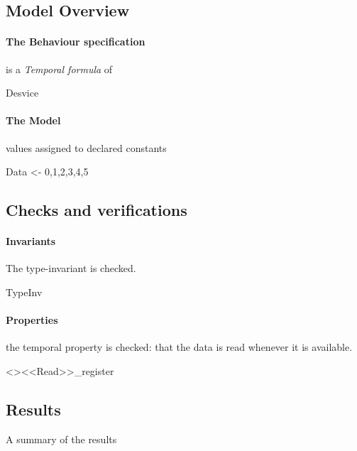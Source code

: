 \documentclass[12pt]{article}
\begin{document}
\subsection{Model Overview}
\paragraph{The Behaviour specification} is a \emph{Temporal formula} of
\begin{tla}
	Desvice
\end{tla}
\begin{tlatex}
%
\end{tlatex}

\paragraph{The Model} values assigned to declared constants
\begin{tla}
	Data <- {0,1,2,3,4,5}
\end{tla}
\begin{tlatex}
%
\end{tlatex}

\subsection{Checks and verifications}
\paragraph{Invariants} The type-invariant is checked.
\begin{tla}
	TypeInv
\end{tla}
\begin{tlatex}
%
\end{tlatex}

\paragraph{Properties} the temporal property is checked: that the data is read
whenever it is available.
\begin{tla}
	[]<><<Read>>_register
\end{tla}
\begin{tlatex}
%
\end{tlatex}

\subsection{Results} A summary of the results
\end{document}
